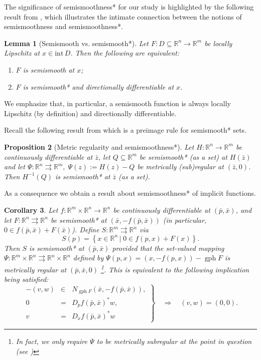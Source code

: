\documentclass[reqno]{amsart}
\newtheorem{proposition}{Proposition}[section]
\newtheorem{corollary}[proposition]{Corollary}
\newtheorem{lemma}[proposition]{Lemma}
\numberwithin{equation}{section}
\newcommand{\R}{\mathbb{R}}
\newcommand{\gph}{\operatorname{gph}}
\newcommand{\set}[2]{\left\{#1\,\left\vert\; #2\right.\right\}}
\newcommand{\inter}{\mathrm{int}\,}
\begin{document}
\noindent
The significance of semismoothness* for our study is highlighted by the following result from \cite[Theorem 3.8]{GfO 21}, which illustrates the intimate connection between the notions of semismoothness and semismoothness*.

\begin{lemma}[Semismooth vs. semismooth*]\label{lem:Semi} Let $F:D\subseteq \R^{n} \to \R^{m}$ be locally Lipschitz at $x\in\inter D$.  Then the following are equivalent:
\begin{enumerate}
\item[(i)] $F$ is semismooth at $x$; 
\item[(ii)] $F$ is semismooth* and directionally differentiable at $x$.
\end{enumerate}
\end{lemma}
\noindent
We emphasize that, in particular, a semismooth function is always locally Lipschitz (by definition) and  directionally differentiable.



Recall the following result from \cite[Proposition 2]{FGH 22} which is a preimage rule for semismooth* sets.

\begin{proposition}[Metric regularity and semismoothness*]\label{prop:Semi} Let $H: \R^{n} \to \R^{m}$ be continuously differentiable at $\bar z$,  let $Q\subseteq\R^{m}$ be semismooth* (as a set) at $H(\bar z)$ and let $\Psi: \R^{n} \rightrightarrows \R^{m},\; \Psi(z):=H(z)-Q$ be metrically  
(sub)regular at $(\bar z,0)$. Then $ H^{-1}(Q)$ is semismooth* at $\bar z$ (as a set).
\end{proposition}

\noindent
As a consequence we obtain  a result about semismoothness* of implicit functions.

\begin{corollary}\label{cor:SemiImplicit} Let $f: \R^m \times \R^n \to \R^n$ be continuously differentiable at $(\bar p,\bar x)$, and let $F:\R^n \rightrightarrows \R^n$ be semismooth* at $(\bar x,-f(\bar p,\bar x))$ (in particular, $0\in f(\bar p,\bar x)+ F(\bar x)$). Define $S:\R^m \rightrightarrows \R^n$ via 
\[
S(p)=\set{x\in \R^n}{0\in f(p,x)+F(x)}.
\]
Then $S$ is semismooth* at $(\bar p,\bar x)$ provided that the set-valued mapping $\Psi:\R^m\times \R^n \rightrightarrows \R^n \times \R^n$ defined by  $\Psi(p,x)=(x,-f(p,x))-\gph F$ is metrically regular at $(\bar p,\bar x,0)$ \footnote{In fact, we only require $\Psi$ to be \emph{metrically subregular} at the point in question (see \cite[Chapter 3H]{DoR 14})}.  This is equivalent to the following implication being satisfied:
\begin{equation}\label{eq:MordSemi}
\left.\begin{array}{rcl}
-(v,w)&\in &N_{\gph F}(\bar x,-f(\bar p,\bar x)),\\
0 & = & D_pf(\bar p,\bar x)^*w,\\
v & = & D_xf(\bar p,\bar x)^*w
\end{array}\right\}  \quad \Longrightarrow\quad (v,w)=(0,0).
\end{equation}

\end{corollary}
\end{document}
